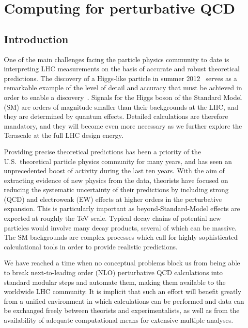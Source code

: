 \section{Computing for perturbative QCD}
\label{chap:PQCD}
\subsection{Introduction}

One of the main challenges facing the particle physics community to date
is interpreting LHC measurements on the basis of accurate and
robust theoretical predictions.  The discovery of a Higgs-like
particle in summer 2012~\cite{Aad:2012tfa,Chatrchyan:2012ufa} serves
as a remarkable example of the level of detail and accuracy that must
be achieved in order to enable a
discovery~\cite{Dittmaier:2011ti,Dittmaier:2012vm,Heinemeyer:2013tqa}.
Signals for the Higgs boson of the Standard Model (SM) are orders of 
magnitude smaller than their backgrounds at the LHC, and they are 
determined by quantum effects.  Detailed calculations are therefore 
mandatory, and they will become even more necessary as we further 
explore the Terascale at the full LHC design energy.

Providing precise theoretical predictions has been a priority of the U.S.\ 
theoretical particle physics community for many years, and has seen an
unprecedented boost of activity during the last ten years. With the
aim of extracting evidence of new physics from the data, theorists
have focused on reducing the systematic uncertainty of their predictions
by including strong (QCD) and electroweak (EW) effects at higher orders
in the perturbative expansion. This is particularly important as
beyond-Standard-Model effects are expected at roughly the TeV scale. 
Typical decay chains of potential new particles would involve many 
decay products, several of which can be massive. The SM backgrounds 
are complex processes which call for highly sophisticated calculational 
tools in order to provide realistic predictions.

We have reached a time when no conceptual problems block us
from being able to break next-to-leading order (NLO)
perturbative QCD calculations into standard modular steps and automate
them, making them available to the worldwide LHC community.  It is
implicit that such an effort will benefit greatly from a unified
environment in which calculations can be performed and data can be
exchanged freely between theorists and experimentalists,
as well as from the availability of adequate computational means
for extensive multiple analyses.

